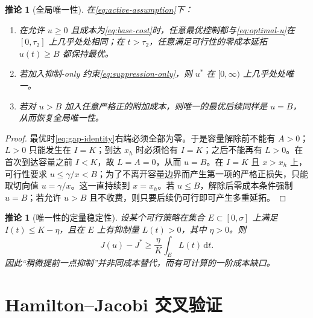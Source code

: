 \documentclass[11pt,a4paper,UTF8]{ctexart}
\newtheorem{corollary}[theorem]{推论}
\theoremstyle{definition}
\newcommand{\dd}{\,\mathrm{d}}
\begin{document}
\begin{corollary}[全局唯一性]
在\eqref{eq:active-assumption}下：
\begin{enumerate}[label=(\roman*),leftmargin=3em]
\item 在允许 $u\ge0$ 且成本为\eqref{eq:base-cost}时，任意最优控制都与\eqref{eq:optimal-u}在 $[0,\tau_2]$ 上几乎处处相同；在 $t>\tau_2$，任意满足可行性的零成本延拓 $u(t)\ge B$ 都保持最优。
\item 若加入抑制-only 约束\eqref{eq:suppression-only}，则 $u^*$ 在 $[0,\infty)$ 上几乎处处唯一。
\item 若对 $u>B$ 加入任意严格正的附加成本，则唯一的最优后续同样是 $u=B$，从而恢复全局唯一性。
\end{enumerate}
\label{cor:uniqueness}
\end{corollary}

\begin{proof}
最优时\eqref{eq:gap-identity}右端必须全部为零。于是容量解除前不能有 $A>0$；$L>0$ 只能发生在 $I=K$；到达 $x_h$ 时必须恰有 $I=K$；之后不能再有 $L>0$。在首次到达容量之前 $I<K$，故 $L=A=0$，从而 $u=B$。在 $I=K$ 且 $x>x_h$ 上，可行性要求 $u\le\gamma/x<B$；为了不离开容量边界而产生第一项的严格正损失，只能取切向值 $u=\gamma/x$。这一直持续到 $x=x_h$。若 $u\le B$，解除后零成本条件强制 $u=B$；若允许 $u>B$ 且不收费，则只要后续仍可行即可产生多重延拓。
\end{proof}

\begin{corollary}[唯一性的定量稳定性]
设某个可行策略在集合 $E\subset[0,\sigma]$ 上满足 $I(t)\le K-\eta$，且在 $E$ 上有抑制量 $L(t)>0$，其中 $\eta>0$。则
\begin{equation}
J(u)-J^*\ge\frac{\eta}{K}\int_E L(t)\dd t.
\label{eq:early-suppression-gap}
\end{equation}
因此“稍微提前一点抑制”并非同成本替代，而有可计算的一阶成本缺口。
\end{corollary}

\section{Hamilton--Jacobi 交叉验证}
\end{document}
